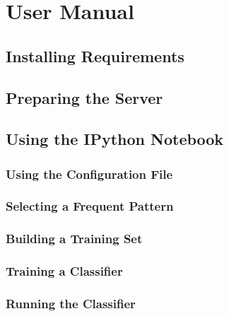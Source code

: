 \chapter{User Manual}\label{ch:userManual}

\section{Installing Requirements}

\section{Preparing the Server}

\section{Using the IPython Notebook}

\subsection{Using the Configuration File}

\subsection{Selecting a Frequent Pattern}

\subsection{Building a Training Set}

\subsection{Training a Classifier}

\subsection{Running the Classifier}






